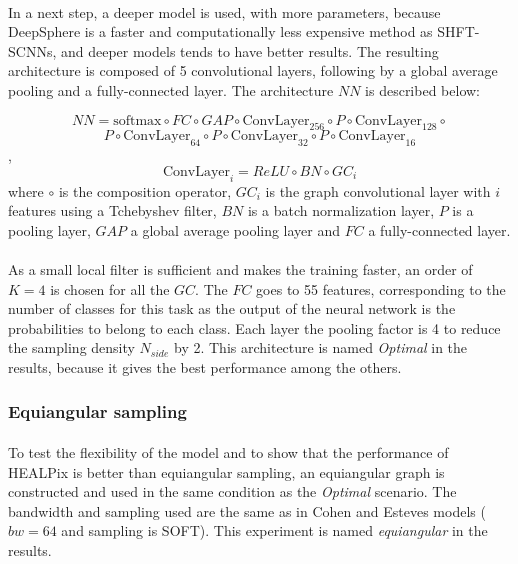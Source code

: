 \documentclass[11pt]{report}
\begin{document}
\paragraph*{}
In a next step, a deeper model is used, with more parameters, because DeepSphere is a faster and computationally less expensive method as SHFT-SCNNs, and deeper models tends to have better results. The resulting architecture is composed of 5 convolutional layers, following by a global average pooling and a fully-connected layer. The architecture $NN$ is described below:

$$ NN = \textrm{softmax} \circ FC \circ GAP \circ \textrm{ConvLayer}_{256} \circ P \circ \textrm{ConvLayer}_{128} \circ$$ $$ P \circ \textrm{ConvLayer}_{64} \circ P \circ \textrm{ConvLayer}_{32} \circ P \circ \textrm{ConvLayer}_{16}  $$,
$$ \textrm{ConvLayer}_i = ReLU \circ BN \circ GC_i $$
where $\circ$ is the composition operator, $GC_i$ is the graph convolutional layer with $i$ features using a Tchebyshev filter, $BN$ is a batch normalization layer, $P$ is a pooling layer, $GAP$ a global average pooling layer and $FC$ a fully-connected layer.

\paragraph*{}
As a small local filter is sufficient and makes the training faster, an order of $K=4$ is chosen for all the $GC$. The $FC$ goes to 55 features, corresponding to the number of classes for this task as the output of the neural network is the probabilities to belong to each class. Each layer the pooling factor is 4 to reduce the sampling density $N_{side}$ by 2. This architecture is named \emph{Optimal} in the results, because it gives the best performance among the others.

\subsubsection{Equiangular sampling}
\paragraph*{}
 To test the flexibility of the model and to show that the performance of HEALPix is better than equiangular sampling, an equiangular graph is constructed and used in the same condition as the \emph{Optimal} scenario. The bandwidth and sampling used are the same as in Cohen and Esteves models ($bw=64$ and sampling is SOFT). This experiment is named \emph{equiangular} in the results.
\end{document}
